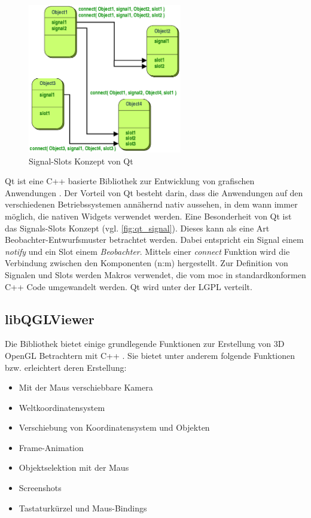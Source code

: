 \begin{figure}
  \centering
  \includegraphics[width=0.6\textwidth]{content/media/qt_signal}
  \caption{Signal-Slots Konzept von Qt \cite{Qt}}
  \label{fig:qt_signal}
\end{figure}

Qt ist eine C++ basierte Bibliothek zur Entwicklung von grafischen Anwendungen \cite{Qt}. 
Der Vorteil von Qt besteht darin, dass die Anwendungen auf den verschiedenen Betriebssystemen annähernd nativ aussehen, in dem wann immer möglich, die nativen Widgets verwendet werden.
Eine Besonderheit von Qt ist das Signals-Slots Konzept (vgl. \autoref{fig:qt_signal}). 
Dieses kann als eine Art Beobachter-Entwurfsmuster betrachtet werden.
Dabei entspricht ein Signal einem \emph{notify} und ein Slot einem \emph{Beobachter}. 
Mittels einer \emph{connect} Funktion wird die Verbindung zwischen den Komponenten (n:m) hergestellt.
Zur Definition von Signalen und Slots werden Makros verwendet, die vom \ac{moc} in standardkonformen C++ Code umgewandelt werden.
Qt wird unter der \ac{LGPL} verteilt.

\subsection{libQGLViewer} %

Die Bibliothek bietet einige grundlegende Funktionen zur Erstellung von 3D OpenGL Betrachtern mit C++ \cite{libQGLViewer}.
Sie bietet unter anderem folgende Funktionen bzw. erleichtert deren Erstellung:

\begin{itemize}
\item Mit der Maus verschiebbare Kamera
\item Weltkoordinatensystem
\item Verschiebung von Koordinatensystem und Objekten
\item Frame-Animation
\item Objektselektion mit der Maus
\item Screenshots
\item Tastaturkürzel und Maus-Bindings
\end{itemize}

